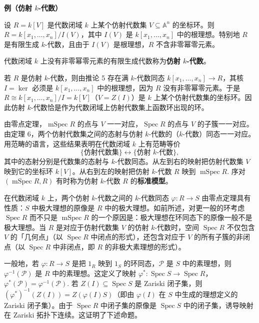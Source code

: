 \noindent\textbf{例（仿射 \(k\)-代数）}

设 \(R = k[V]\) 是代数闭域 \(k\) 上某个仿射代数集 \(V \subseteq \mathbb{A}^n\) 的坐标环。则 \(R = k[x_1, \ldots, x_n]/I(V)\)，其中 \(I(V)\) 是 \(k[x_1, \ldots, x_n]\) 中的根理想。特别地 \(R\) 是有限生成 \(k\)-代数，且由于 \(I(V)\) 是根理想，\(R\) 不含非零幂零元素。

\begin{definition}
代数闭域 \(k\) 上没有非零幂零元素的有限生成代数称为\textbf{仿射 \(k\)-代数}。
\end{definition}

若 \(R\) 是仿射 \(k\)-代数，则由推论 5 存在满 \(k\)-代数同态 \(k[x_1, \ldots, x_n] \to R\)，其核 \(I = \ker\) 必须是 \(k[x_1, \ldots, x_n]\) 中的根理想，因为 \(R\) 没有非零幂零元素。于是 \(R \cong k[x_1, \ldots, x_n]/I = k[V]\)（\(V = Z(I)\)）是 \(k\) 上某个仿射代数集的坐标环。因此仿射 \(k\)-代数恰是作为代数闭域上仿射代数集上函数环出现的环。

由零点定理，\(\operatorname{mSpec}R\) 的点与 \(V\) 一一对应，\(\operatorname{Spec}R\) 的点与 \(V\) 的子簇一一对应。由定理 6，两个仿射代数集之间的态射与仿射 \(k\)-代数的（\(k\)-代数）同态一一对应。用范畴的语言，这些结果表明在代数闭域 \(k\) 上有范畴等价
\[
\{\text{仿射代数集}\} \longleftrightarrow \{\text{仿射 } k\text{-代数}\},
\]
其中的态射分别是代数集的态射与 \(k\)-代数同态。从左到右的映射把仿射代数集 \(V\) 映到它的坐标环 \(k[V]\)。从右到左的映射把仿射 \(k\)-代数 \(R\) 映到 \(\operatorname{mSpec}R\). 序对 \((\operatorname{mSpec}R, R)\) 有时称为仿射 \(k\)-代数 \(R\) 的\textbf{标准模型}。

在代数闭域 \(k\) 上，两个仿射 \(k\)-代数之间的 \(k\)-代数同态 \(\varphi : R \to S\) 由零点定理具有性质：\(S\) 中极大理想的原像是 \(R\) 中的极大理想。如前所述，对更一般的环考虑 \(\operatorname{Spec}R\) 而不只是 \(\operatorname{mSpec}R\) 的一个原因是：极大理想在环同态下的原像一般不是极大理想。当 \(R\) 是对应于仿射代数集 \(V\) 的仿射 \(k\)-代数时，空间 \(\operatorname{Spec}R\) 不仅包含 \(V\) 的「几何点」（以 \(\operatorname{Spec}R\) 中闭点的形式），还包含对应于 \(V\) 的所有子簇的非闭点（以 \(\operatorname{Spec}R\) 中非闭点，即 \(R\) 的非极大素理想的形式）。

一般地，若 \(\varphi : R \to S\) 是把 \(1_R\) 映到 \(1_S\) 的环同态，\(\mathcal{P}\) 是 \(S\) 中的素理想，则 \(\varphi^{-1}(\mathcal{P})\) 是 \(R\) 中的素理想。这定义了映射 \(\varphi^* : \operatorname{Spec}S \to \operatorname{Spec}R\)，\(\varphi^*(\mathcal{P}) = \varphi^{-1}(\mathcal{P})\). 若 \(Z(I) \subseteq \operatorname{Spec}S\) 是 Zariski 闭子集，则 \((\varphi^*)^{-1}(Z(I)) = Z(\varphi(I)S)\)（即由 \(\varphi(I)\) 在 \(S\) 中生成的理想定义的 Zariski 闭子集）。由于 \(\operatorname{Spec}R\) 中闭子集的原像是 \(\operatorname{Spec}S\) 中的闭子集，诱导映射在 Zariski 拓扑下连续。这证明了下述命题。

